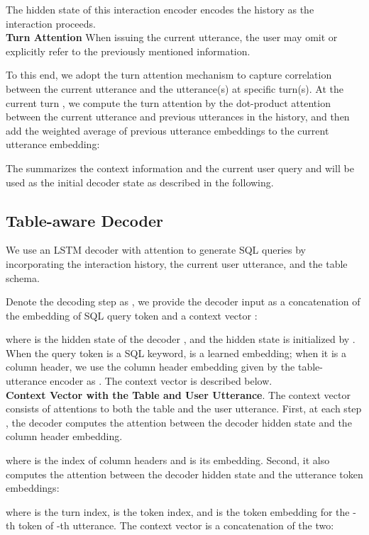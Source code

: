\documentclass[11pt,a4paper]{article}
\newcommand{\hide}[1]{}
\begin{document}
The hidden state of this interaction encoder  encodes the history as the interaction proceeds.
\\\noindent
\textbf{Turn Attention}
When issuing the current utterance, the user may omit or explicitly refer to the previously mentioned information.
\hide{
This requires the model to capture the relationships between the current utterance and the context history.
}
To this end, we adopt the turn attention mechanism to capture correlation between the current utterance and the utterance(s) at specific turn(s).
At the current turn , we compute the turn attention by the dot-product attention between the current utterance and previous utterances in the history, and then add the weighted average of previous utterance embeddings to the current utterance embedding:

The  summarizes the context information and the current user query and will be used as the initial decoder state as described in the following.

\subsection{Table-aware Decoder}
\label{sec:table-aware-decoder}
We use an LSTM decoder with attention to generate SQL queries by incorporating the interaction history, the current user utterance, and the table schema.

Denote the decoding step as , we provide the decoder input as a concatenation of the embedding of SQL query token  and a context vector :

where  is the hidden state of the decoder , and the hidden state  is initialized by .
When the query token is a SQL keyword,  is a learned embedding; when it is a column header, we use the column header embedding given by the table-utterance encoder as .
The context vector  is described below.
\\\noindent
\textbf{Context Vector with the Table and User Utterance}. 
The context vector consists of attentions to both the table and the user utterance.
First, at each step , the decoder computes the attention between the decoder hidden state and the column header embedding.

where  is the index of column headers and  is its embedding.
Second, it also computes the attention between the decoder hidden state and the utterance token embeddings:

where  is the turn index,  is the token index, and  is the token embedding for the -th token of -th utterance.
The context vector  is a concatenation of the two:
\end{document}

